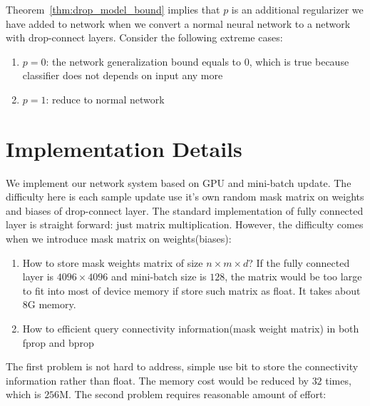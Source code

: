 \documentclass[9pt]{article}
\begin{document}
\begin{remark}
   Theorem~\ref{thm:drop_model_bound} implies that $p$ is an additional regularizer
   we have added to network when we convert a normal neural network to a network
   with drop-connect layers. Consider the following extreme cases:
   \begin{enumerate}
       \item $p=0$: the network generalization bound equals to 0, 
           which is true because classifier does not depends on input any more
       \item $p=1$: reduce to normal network
   \end{enumerate}
\end{remark}

\section{Implementation Details}
We implement our network system based on GPU and mini-batch update. The
difficulty here is each sample update use it's own random mask matrix
on weights and biases of drop-connect layer. The standard implementation
of fully connected layer is straight forward: just matrix multiplication.
However, the difficulty comes when we introduce mask matrix on weights(biases):
\begin{enumerate}
    \item How to store mask weights matrix of size $n\times m\times d$? If the fully
        connected layer is $4096\times 4096$ and mini-batch size is $128$, the matrix would
        be too large to fit into most of device memory if store such matrix as float.
        It takes about $8$G memory.
    \item How to efficient query connectivity information(mask weight matrix) in both
        fprop and bprop
\end{enumerate}
The first problem is not hard to address, simple use bit to store the connectivity information 
rather than float. The memory cost would be reduced by $32$ times, which is $256$M. The
second problem requires reasonable amount of effort:
\end{document}
